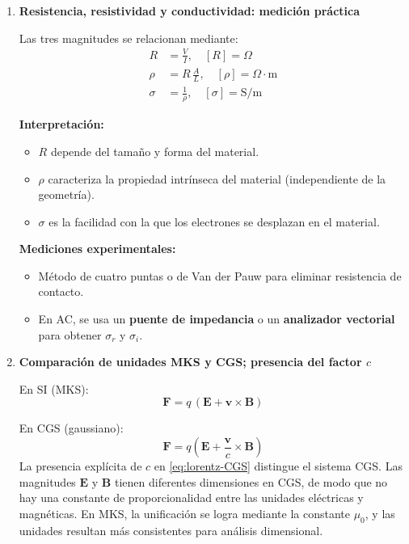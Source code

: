 \documentclass{article}
\begin{document}
\begin{enumerate}[label=\textbf{Actividad \arabic*.}, leftmargin=*]
A frecuencias altas \((\omega\tau \gg 1)\), los electrones no logran seguir el campo oscilante y la parte real de la conductividad disminuye drásticamente, indicando comportamiento más “reactivo” que conductor.

\item \textbf{Resistencia, resistividad y conductividad: medición práctica}

Las tres magnitudes se relacionan mediante:
\begin{align}
R &= \frac{V}{I}, \quad [R]=\Omega \label{eq:resistencia}\\[4pt]
\rho &= R\,\frac{A}{L}, \quad [\rho]=\Omega\cdot \mathrm{m} \label{eq:resistividad}\\[4pt]
\sigma &= \frac{1}{\rho}, \quad [\sigma]=\mathrm{S/m} \label{eq:conductividad}
\end{align}

\textbf{Interpretación:}
\begin{itemize}
\item \(R\) depende del tamaño y forma del material.
\item \(\rho\) caracteriza la propiedad intrínseca del material (independiente de la geometría).
\item \(\sigma\) es la facilidad con la que los electrones se desplazan en el material.
\end{itemize}

\textbf{Mediciones experimentales:}
\begin{itemize}
\item Método de cuatro puntas o de Van der Pauw para eliminar resistencia de contacto.
\item En AC, se usa un \textbf{puente de impedancia} o un \textbf{analizador vectorial} para obtener \(\sigma_r\) y \(\sigma_i\).
\end{itemize}

\item \textbf{Comparación de unidades MKS y CGS; presencia del factor \(c\)}

En SI (MKS):
\begin{equation}
\mathbf{F} = q\,(\mathbf{E} + \mathbf{v}\times\mathbf{B})
\label{eq:lorentz-SI}
\end{equation}

En CGS (gaussiano):
\begin{equation}
\mathbf{F} = q\left(\mathbf{E} + \frac{\mathbf{v}}{c}\times\mathbf{B}\right)
\label{eq:lorentz-CGS}
\end{equation}
La presencia explícita de \(c\) en \eqref{eq:lorentz-CGS} distingue el sistema CGS.
Las magnitudes \(\mathbf{E}\) y \(\mathbf{B}\) tienen diferentes dimensiones en CGS, de modo que no hay una constante de proporcionalidad entre las unidades eléctricas y magnéticas.  
En MKS, la unificación se logra mediante la constante \(\mu_0\), y las unidades resultan más consistentes para análisis dimensional.


\end{enumerate}
\end{document}
